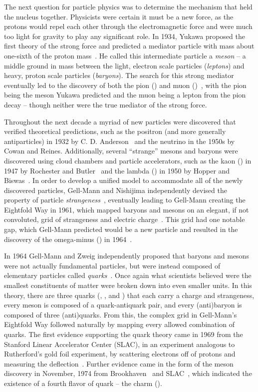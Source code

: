The next question for particle physics was to determine the mechanism that held the nucleus together. Physicists were certain it must be a new force, as the protons would repel each other through the electromagnetic force and were much too light for gravity to play any significant role. In 1934, Yukawa proposed the first theory of the strong force and predicted a mediator particle with mass about one-sixth of the proton mass~\cite{QFTNutshell}. He called this intermediate particle a \textit{meson} -- a middle ground in mass between the light, electron scale particles (\textit{leptons}) and heavy, proton scale particles (\textit{baryons}). The search for this strong mediator eventually led to the discovery of both the pion (\PGp) and muon (\PGm)~\cite{pion_discovery}, with the pion being the meson Yukawa predicted and the muon being a lepton from the pion decay -- though neither were the true mediator of the strong force.

Throughout the next decade a myriad of new particles were discovered that verified theoretical predictions, such as the positron (and more generally antiparticles) in 1932 by C. D. Anderson~\cite{positron_discovery} and the neutrino in the 1950s by Cowan and Reines\cite{neutrino_discovery}. Additionally, several ``strange'' mesons and baryons were discovered using cloud chambers and particle accelerators, such as the kaon (\PKz) in 1947 by Rochester and Butler~\cite{kaon_discovery} and the lambda (\PGL) in 1950 by Hopper and Biswas~\cite{lambda_discovery}. In order to develop a unified model to accommodate all of the newly discovered particles, Gell-Mann and Nishijima independently devised the property of particle \textit{strangeness}~\cite{strangeness_gellmann,strangeness_nishijima}, eventually leading to Gell-Mann creating the Eightfold Way in 1961, which mapped baryons and mesons on an elegant, if not convoluted, grid of strangeness and electric charge~\cite{eightfoldway}. This grid had one notable gap, which Gell-Mann predicted would be a new particle and resulted in the discovery of the omega-minus (\PGOm) in 1964~\cite{omega_discovery}.

In 1964 Gell-Mann and Zweig independently proposed that baryons and mesons were not actually fundamental particles, but were instead composed of elementary particles called \textit{quarks}~\cite{gellmann_quarks,zweig_quarks}. Once again what scientists believed were the smallest constituents of matter were broken down into even smaller units. In this theory, there are three quarks (\PQu, \PQd, and \PQs) that each carry a charge and strangeness, every meson is composed of a quark-antiquark pair, and every (anti)baryon is composed of three (anti)quarks. From this, the complex grid in Gell-Mann's Eightfold Way followed naturally by mapping every allowed combination of quarks. The first evidence supporting the quark theory came in 1969 from the Stanford Linear Accelerator Center (SLAC), in an experiment analogous to Rutherford's gold foil experiment, by scattering electrons off of protons and measuring the deflection~\cite{slac_quark}. Further evidence came in the form of the \PJGy meson discovery in November, 1974 from Brookhaven~\cite{jpsi_brookhaven} and SLAC~\cite{jpsi_slac}, which indicated the existence of a fourth flavor of quark -- the charm (\PQc).


